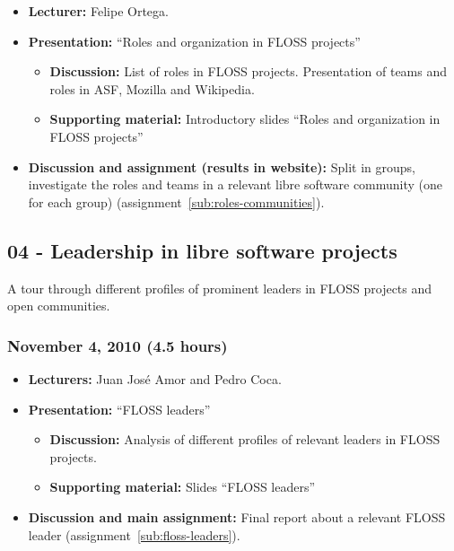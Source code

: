 \documentclass[a4paper]{article}
\begin{document}
\begin{itemize}
\item \textbf{Lecturer:} Felipe Ortega.
\item \textbf{Presentation:} ``Roles and organization in FLOSS projects''
  \begin{itemize}
  \item \textbf{Discussion:} List of roles in FLOSS projects. Presentation of teams and roles in ASF, Mozilla and Wikipedia.
  \item \textbf{Supporting material:} Introductory slides ``Roles and organization in FLOSS projects''
  \end{itemize}
\item \textbf{Discussion and assignment (results in website):} Split in groups, investigate the roles and teams in a relevant
libre software community (one for each group) (assignment~\ref{sub:roles-communities}).
\end{itemize}

\subsection{04 - Leadership in libre software projects}

A tour through different profiles of prominent leaders in FLOSS projects and open communities.

\subsubsection{November 4, 2010 (4.5 hours)}

\begin{itemize}
\item \textbf{Lecturers:} Juan José Amor and Pedro Coca.
\item \textbf{Presentation:} ``FLOSS leaders''
  \begin{itemize}
  \item \textbf{Discussion:} Analysis of different profiles of relevant leaders in FLOSS projects.
  \item \textbf{Supporting material:} Slides ``FLOSS leaders''
  \end{itemize}
\item \textbf{Discussion and main assignment:} Final report about a relevant FLOSS leader (assignment~\ref{sub:floss-leaders}).

\end{itemize}
\end{document}
